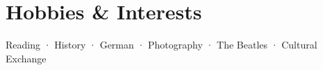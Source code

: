 \documentclass[12pt]{article}
\begin{document}
\vspace{-5mm} %

\section{Hobbies \& Interests}

Reading · History · German · Photography · The Beatles · Cultural Exchange

\vfill
\end{document}

